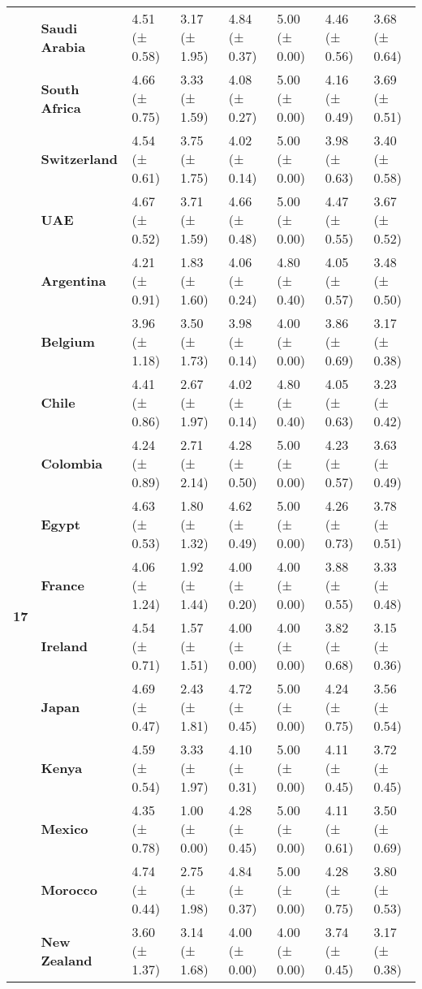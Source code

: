 \begin{longtable}{llllllll}
\textbf{} & \textbf{Saudi Arabia} & 4.51 (± 0.58) & 3.17 (± 1.95) & 4.84 (± 0.37) & 5.00 (± 0.00) & 4.46 (± 0.56) & 3.68 (± 0.64) \\
\textbf{} & \textbf{South Africa} & 4.66 (± 0.75) & 3.33 (± 1.59) & 4.08 (± 0.27) & 5.00 (± 0.00) & 4.16 (± 0.49) & 3.69 (± 0.51) \\
\textbf{} & \textbf{Switzerland} & 4.54 (± 0.61) & 3.75 (± 1.75) & 4.02 (± 0.14) & 5.00 (± 0.00) & 3.98 (± 0.63) & 3.40 (± 0.58) \\
\textbf{} & \textbf{UAE} & 4.67 (± 0.52) & 3.71 (± 1.59) & 4.66 (± 0.48) & 5.00 (± 0.00) & 4.47 (± 0.55) & 3.67 (± 0.52) \\
\cline{1-8}
\multirow[t]{19}{*}{\textbf{17}} & \textbf{Argentina} & 4.21 (± 0.91) & 1.83 (± 1.60) & 4.06 (± 0.24) & 4.80 (± 0.40) & 4.05 (± 0.57) & 3.48 (± 0.50) \\
\textbf{} & \textbf{Belgium} & 3.96 (± 1.18) & 3.50 (± 1.73) & 3.98 (± 0.14) & 4.00 (± 0.00) & 3.86 (± 0.69) & 3.17 (± 0.38) \\
\textbf{} & \textbf{Chile} & 4.41 (± 0.86) & 2.67 (± 1.97) & 4.02 (± 0.14) & 4.80 (± 0.40) & 4.05 (± 0.63) & 3.23 (± 0.42) \\
\textbf{} & \textbf{Colombia} & 4.24 (± 0.89) & 2.71 (± 2.14) & 4.28 (± 0.50) & 5.00 (± 0.00) & 4.23 (± 0.57) & 3.63 (± 0.49) \\
\textbf{} & \textbf{Egypt} & 4.63 (± 0.53) & 1.80 (± 1.32) & 4.62 (± 0.49) & 5.00 (± 0.00) & 4.26 (± 0.73) & 3.78 (± 0.51) \\
\textbf{} & \textbf{France} & 4.06 (± 1.24) & 1.92 (± 1.44) & 4.00 (± 0.20) & 4.00 (± 0.00) & 3.88 (± 0.55) & 3.33 (± 0.48) \\
\textbf{} & \textbf{Ireland} & 4.54 (± 0.71) & 1.57 (± 1.51) & 4.00 (± 0.00) & 4.00 (± 0.00) & 3.82 (± 0.68) & 3.15 (± 0.36) \\
\textbf{} & \textbf{Japan} & 4.69 (± 0.47) & 2.43 (± 1.81) & 4.72 (± 0.45) & 5.00 (± 0.00) & 4.24 (± 0.75) & 3.56 (± 0.54) \\
\textbf{} & \textbf{Kenya} & 4.59 (± 0.54) & 3.33 (± 1.97) & 4.10 (± 0.31) & 5.00 (± 0.00) & 4.11 (± 0.45) & 3.72 (± 0.45) \\
\textbf{} & \textbf{Mexico} & 4.35 (± 0.78) & 1.00 (± 0.00) & 4.28 (± 0.45) & 5.00 (± 0.00) & 4.11 (± 0.61) & 3.50 (± 0.69) \\
\textbf{} & \textbf{Morocco} & 4.74 (± 0.44) & 2.75 (± 1.98) & 4.84 (± 0.37) & 5.00 (± 0.00) & 4.28 (± 0.75) & 3.80 (± 0.53) \\
\textbf{} & \textbf{New Zealand} & 3.60 (± 1.37) & 3.14 (± 1.68) & 4.00 (± 0.00) & 4.00 (± 0.00) & 3.74 (± 0.45) & 3.17 (± 0.38) \\

\end{longtable}
